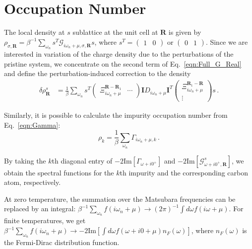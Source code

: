 \documentclass[aps,prb,superscriptaddress,preprint,floatfix]{revtex4-1}
\begin{document}
\section{Occupation Number}

The local density at $s$ sublattice at the unit cell at $\mathbf{R}$ is given by $\rho_{\sigma,\mathbf{R}} = \beta^{-1}\sum_{\omega_n}s^T \mathcal{G}_{i\omega_n + \mu,\sigma,\mathbf{R}}s$, where $s^T = \begin{pmatrix}
	1 &0
\end{pmatrix}$ or $\begin{pmatrix}
	0&1
\end{pmatrix}$. Since we are interested in variation of the charge density due to the perturbations of the pristine system, we concentrate on the second term of Eq.~\eqref{eqn:Full_G_Real} and define the perturbation-induced correction to the density
%
\begin{align}
	\delta \rho_{\mathbf{R}}^s
	 & =
    \frac{1}{\beta}\sum_{\omega_n}
	s^T\begin{pmatrix}
	 	\Xi_{i\omega_n + \mu}^{\mathbf{R} - \mathbf{R}_1} & \cdots
	 \end{pmatrix}
	 \mathbf{I} 
	 D_{i\omega_n + \mu}
	 \mathbf{I}^T
	 \begin{pmatrix}
	 	\Xi_{i\omega_n + \mu}^{\mathbf{R}_1 - \mathbf{R}} \\ \vdots
	 \end{pmatrix}
	s
	\,.
	\label{eqn:Delta_rho}
\end{align}
%

Similarly, it is possible to calculate the impurity occupation number from Eq.~\eqref{eqn:Gamma}:
%
\begin{equation}
    \rho_{k}= \frac{1}{\beta}\sum_{\omega_n} \Gamma_{i\omega_n + \mu, k}  \,.
    \label{eqn:rho_imp}
\end{equation}
%


By taking the $k$th diagonal entry of $-2\mathrm{Im}\left[\Gamma_{\omega + i0^+}\right]$ and $-2\mathrm{Im}\left[\mathcal{G}_{\omega+i0^+,\mathbf{R}}^s\right]$, we obtain the spectral functions for the $k$th impurity and the corresponding carbon atom, respectively. 

At zero temperature, the summation over the Matsubara frequencies can be replaced by an integral: $\beta^{-1}\sum_{\omega_n} f(i\omega_n + \mu)\rightarrow (2\pi)^{-1} \int d\omega f(i\omega + \mu)$. For finite temperatures, we get $\beta^{-1}\sum_{\omega_n} f(i\omega_n + \mu)\rightarrow -2 \mathrm{Im}\left[\int d\omega f(\omega + i0 + \mu)n_F(\omega)\right]$, where $n_F(\omega)$ is the Fermi-Dirac distribution function.
\end{document}
